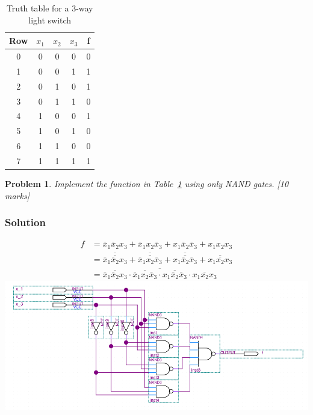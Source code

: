 \documentclass[twocolumn]{article}
\newtheorem{prob}{Problem}
\newcommand{\bx}{\bar{x}}
\begin{document}
\begin{table}
  \centering
  \begin{tabular}{c|ccc||c}
    \toprule
    Row & $x_1$ & $x_2$ & $x_3$ & f \\
    \midrule
    0 & 0 & 0 & 0 & 0 \\
    1 & 0 & 0 & 1 & 1 \\
    2 & 0 & 1 & 0 & 1 \\
    3 & 0 & 1 & 1 & 0 \\
    4 & 1 & 0 & 0 & 1 \\
    5 & 1 & 0 & 1 & 0 \\
    6 & 1 & 1 & 0 & 0 \\
    7 & 1 & 1 & 1 & 1 \\
    \bottomrule
    \end{tabular}
    \caption{Truth table for a 3-way light switch}
    \label{tab:3-way-light-switch}
\end{table}

\begin{prob}
 Implement the function in Table~\ref{tab:3-way-light-switch} using only NAND
 gates. [10 marks]
\end{prob}
\subsubsection*{Solution}
\begin{align*}
  f &= \bx_1 \bx_2 x_3 + \bx_1 x_2 \bx_3 + x_1 \bx_2 \bx_3 + x_1 x_2 x_3
  \\
    &= \overline{\overline{\bx_1 \bx_2 x_3}} + \overline{\overline{\bx_1 x_2 \bx_3}} + \overline{\overline{x_1 \bx_2 \bx_3}} + \overline{\overline{x_1 x_2 x_3}}
  \\
    &= \overline{\overline{\bx_1 \bx_2 x_3} \cdot {\overline{\bx_1 x_2 \bx_3}} \cdot {\overline{x_1 \bx_2 \bx_3}} \cdot {\overline{x_1 x_2 x_3}}}
\end{align*}
\includegraphics[width=\linewidth]{files/hw2p3.png}
\end{document}
